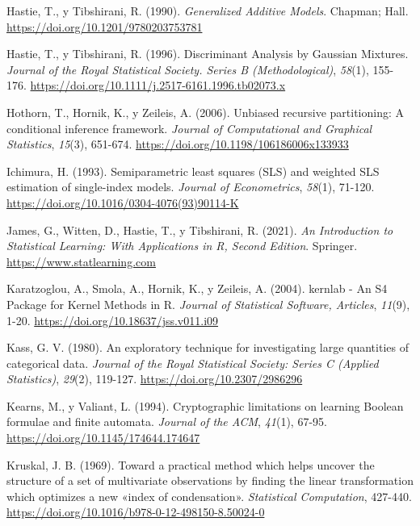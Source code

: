 \documentclass[
  spanish,
]{book}
\theoremstyle{break}
\theoremstyle{definition}
\theoremstyle{definition}
\theoremstyle{definition}
\theoremstyle{remark}
\begin{document}
\leavevmode\hypertarget{ref-hastie1990generalized}{}%
Hastie, T., y Tibshirani, R. (1990). \emph{Generalized Additive Models}. Chapman; Hall. \url{https://doi.org/10.1201/9780203753781}

\leavevmode\hypertarget{ref-hastie1996fisher}{}%
Hastie, T., y Tibshirani, R. (1996). Discriminant Analysis by Gaussian Mixtures. \emph{Journal of the Royal Statistical Society. Series B (Methodological)}, \emph{58}(1), 155-176. \url{https://doi.org/10.1111/j.2517-6161.1996.tb02073.x}

\leavevmode\hypertarget{ref-hothorn2006unbiased}{}%
Hothorn, T., Hornik, K., y Zeileis, A. (2006). Unbiased recursive partitioning: A conditional inference framework. \emph{Journal of Computational and Graphical Statistics}, \emph{15}(3), 651-674. \url{https://doi.org/10.1198/106186006x133933}

\leavevmode\hypertarget{ref-ichimura1993}{}%
Ichimura, H. (1993). Semiparametric least squares (SLS) and weighted SLS estimation of single-index models. \emph{Journal of Econometrics}, \emph{58}(1), 71-120. \url{https://doi.org/10.1016/0304-4076(93)90114-K}

\leavevmode\hypertarget{ref-james2021introduction}{}%
James, G., Witten, D., Hastie, T., y Tibshirani, R. (2021). \emph{An Introduction to Statistical Learning: With Applications in R, Second Edition}. Springer. \url{https://www.statlearning.com}

\leavevmode\hypertarget{ref-kernlab2004}{}%
Karatzoglou, A., Smola, A., Hornik, K., y Zeileis, A. (2004). kernlab - An S4 Package for Kernel Methods in R. \emph{Journal of Statistical Software, Articles}, \emph{11}(9), 1-20. \url{https://doi.org/10.18637/jss.v011.i09}

\leavevmode\hypertarget{ref-kass1980exploratory}{}%
Kass, G. V. (1980). An exploratory technique for investigating large quantities of categorical data. \emph{Journal of the Royal Statistical Society: Series C (Applied Statistics)}, \emph{29}(2), 119-127. \url{https://doi.org/10.2307/2986296}

\leavevmode\hypertarget{ref-kearns_cryptographic_1994}{}%
Kearns, M., y Valiant, L. (1994). Cryptographic limitations on learning Boolean formulae and finite automata. \emph{Journal of the ACM}, \emph{41}(1), 67-95. \url{https://doi.org/10.1145/174644.174647}

\leavevmode\hypertarget{ref-kruskal1969toward}{}%
Kruskal, J. B. (1969). Toward a practical method which helps uncover the structure of a set of multivariate observations by finding the linear transformation which optimizes a new «index of condensation». \emph{Statistical Computation}, 427-440. \url{https://doi.org/10.1016/b978-0-12-498150-8.50024-0}
\end{document}
